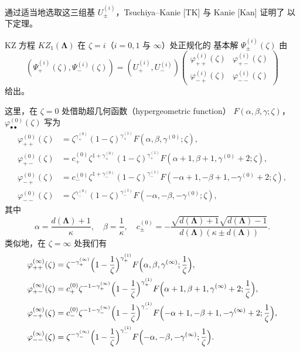 通过适当地选取这三组基 $U_\pm^{(i)}$，Tsuchiya–Kanie [TK] 与 Kanie [Kan] 证明了
以下定理。

\begin{theorem}[6.23]
KZ 方程 $KZ_1(\mathbf{\Lambda})$ 在 $\zeta=i$（$i=0,1$ 与 $\infty$）处正规化的
基本解 $\Psi_\pm^{(i)}(\zeta)$ 由
\[
(\Psi_+^{(i)}(\zeta),\Psi_-^{(i)}(\zeta))
=(U_+^{(i)},U_-^{(i)})
\begin{pmatrix}
\varphi_{++}^{(i)}(\zeta) & \varphi_{+-}^{(i)}(\zeta)\\
\varphi_{-+}^{(i)}(\zeta) & \varphi_{--}^{(i)}(\zeta)
\end{pmatrix}
\]
给出。
\end{theorem}

这里，在 $\zeta=0$ 处借助超几何函数（hypergeometric function）
$F(\alpha,\beta,\gamma;\zeta)$，$\varphi_{\bullet\bullet}^{(0)}(\zeta)$ 写为
\[
\begin{aligned}
\varphi_{++}^{(0)}(\zeta)&=\zeta^{\gamma_+^{(0)}}
(1-\zeta)^{\gamma_+^{(1)}}F(\alpha,\beta,\gamma^{(0)};\zeta),\\
\varphi_{+-}^{(0)}(\zeta)&=c_+^{(0)}\zeta^{1+\gamma_+^{(0)}}
(1-\zeta)^{\gamma_+^{(1)}}F(\alpha+1,\beta+1,\gamma^{(0)}+2;\zeta),\\
\varphi_{-+}^{(0)}(\zeta)&=c_-^{(0)}\zeta^{1+\gamma_-^{(0)}}
(1-\zeta)^{\gamma_-^{(1)}}F(-\alpha+1,-\beta+1,-\gamma^{(0)}+2;\zeta),\\
\varphi_{--}^{(0)}(\zeta)&=\zeta^{\gamma_-^{(0)}}
(1-\zeta)^{\gamma_-^{(1)}}F(-\alpha,-\beta,-\gamma^{(0)};\zeta),
\end{aligned}
\]
其中
\[
\alpha=\frac{d(\mathbf{\Lambda})+1}{\kappa},\quad
\beta=\frac{1}{\kappa},\quad
c_\pm^{(0)}=-\frac{\sqrt{d(\mathbf{\Lambda})+1}\sqrt{d(\mathbf{\Lambda})-1}}
{d(\mathbf{\Lambda})(\kappa\pm d(\mathbf{\Lambda}))}.
\]
类似地，在 $\zeta=\infty$ 处我们有
\[
\begin{aligned}
\varphi_{++}^{(\infty)}(\zeta)&=\zeta^{-\gamma_+^{(\infty)}}
\Bigl(1-\frac{1}{\zeta}\Bigr)^{\gamma_+^{(1)}}
F\Bigl(\alpha,\beta,\gamma^{(\infty)};\frac{1}{\zeta}\Bigr),\\
\varphi_{+-}^{(\infty)}(\zeta)&=c_+^{(0)}\zeta^{-1-\gamma_+^{(\infty)}}
\Bigl(1-\frac{1}{\zeta}\Bigr)^{\gamma_+^{(1)}}
F\Bigl(\alpha+1,\beta+1,\gamma^{(\infty)}+2;\frac{1}{\zeta}\Bigr),\\
\varphi_{-+}^{(\infty)}(\zeta)&=c_-^{(0)}\zeta^{-1-\gamma_-^{(\infty)}}
\Bigl(1-\frac{1}{\zeta}\Bigr)^{\gamma_-^{(1)}}
F\Bigl(-\alpha+1,-\beta+1,-\gamma^{(\infty)}+2;\frac{1}{\zeta}\Bigr),\\
\varphi_{--}^{(\infty)}(\zeta)&=\zeta^{-\gamma_-^{(\infty)}}
\Bigl(1-\frac{1}{\zeta}\Bigr)^{\gamma_-^{(1)}}
F\Bigl(-\alpha,-\beta,-\gamma^{(\infty)};\frac{1}{\zeta}\Bigr).
\end{aligned}
\]
